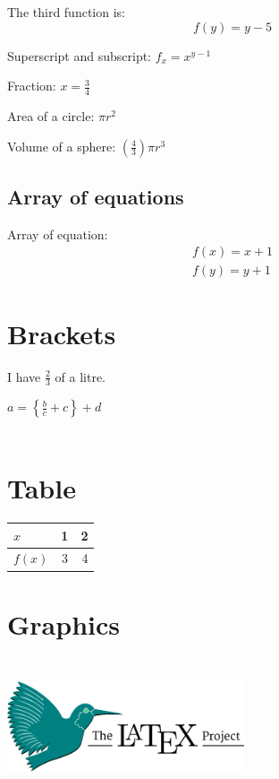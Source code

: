 \documentclass[12pt]{article}
\begin{document}
The third function is:
\begin{equation}
 f(y) = y-5
\end{equation}

Superscript and subscript: $f_x = x^{y-1}$

Fraction: $x = \frac{3}{4}$

Area of a circle: $\pi r^2$

Volume of a sphere: $(\frac{4}{3})\pi r^3$

\subsection{Array of equations}
Array of equation:
\begin{eqnarray}
f(x) = x+1\\
f(y) = y+1
\end{eqnarray}

\section{Brackets}
I have $\displaystyle\frac{2}{3}$ of a litre.

$a = \left\{\frac{b}{c}+c\right\}+d$
\\ \\
\section{Table}
\begin{table}[h]
	\centering
	\begin{tabular}{|l|c|r|}
	\hline
	$x$ & 1 & 2\\\hline
	$f(x)$ & 3 & 4\\\hline
\end{tabular}
\end{table}

\section{Graphics}
\begin{center}
\includegraphics[height=4cm, width=7cm]{images.png}
\end{center}
\end{document}
